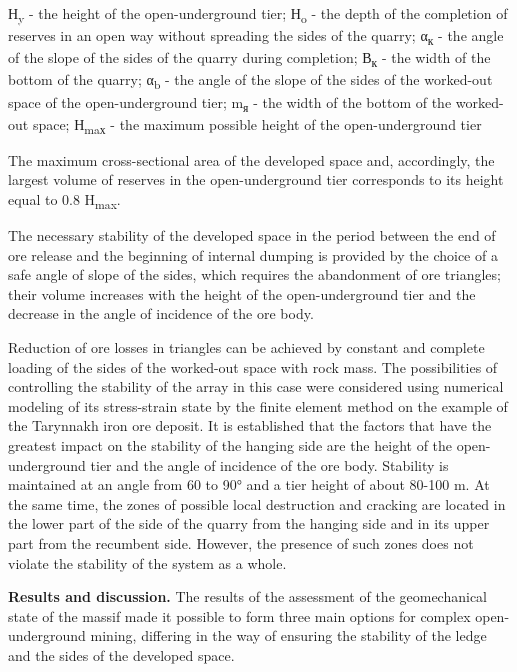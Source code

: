 \begin{multicols}{2}
Н\textsubscript{y} - the height of the open-underground tier;
Н\textsubscript{o} - the depth of the completion of reserves in an open
way without spreading the sides of the quarry; α\textsubscript{к} - the
angle of the slope of the sides of the quarry during completion;
В\textsubscript{к} - the width of the bottom of the quarry;
α\textsubscript{b} - the angle of the slope of the sides of the
worked-out space of the open-underground tier; m\textsubscript{я} - the
width of the bottom of the worked-out space; Н\textsubscript{maх} - the
maximum possible height of the open-underground tier

The maximum cross-sectional area of the developed space and,
accordingly, the largest volume of reserves in the open-underground tier
corresponds to its height equal to 0.8 H\textsubscript{max}.

The necessary stability of the developed space in the period between the
end of ore release and the beginning of internal dumping is provided by
the choice of a safe angle of slope of the sides, which requires the
abandonment of ore triangles; their volume increases with the height of
the open-underground tier and the decrease in the angle of incidence of
the ore body.

Reduction of ore losses in triangles can be achieved by constant and
complete loading of the sides of the worked-out space with rock mass.
The possibilities of controlling the stability of the array in this case
were considered using numerical modeling of its stress-strain state by
the finite element method on the example of the Tarynnakh iron ore
deposit. It is established that the factors that have the greatest
impact on the stability of the hanging side are the height of the
open-underground tier and the angle of incidence of the ore body.
Stability is maintained at an angle from 60 to 90° and a tier height of
about 80-100 m. At the same time, the zones of possible local
destruction and cracking are located in the lower part of the side of
the quarry from the hanging side and in its upper part from the
recumbent side. However, the presence of such zones does not violate the
stability of the system as a whole.

{\bfseries Results and discussion.} The results of the assessment of the
geomechanical state of the massif made it possible to form three main
options for complex open-underground mining, differing in the way of
ensuring the stability of the ledge and the sides of the developed
space.


\end{multicols}
